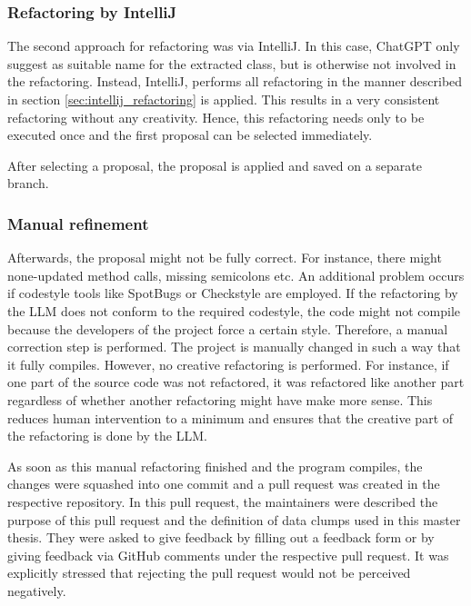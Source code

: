 \subsubsection{Refactoring by IntelliJ}

The second approach for refactoring was via IntelliJ. In this case, ChatGPT only suggest as suitable name for the extracted class, but is otherwise not involved in the refactoring. Instead, IntelliJ, performs all refactoring in the manner described in section  \ref{sec:intellij_refactoring} is applied. This results in a very consistent refactoring without any creativity. Hence, this refactoring needs only to be executed once and the first proposal can be selected immediately. 

After selecting a proposal, the proposal is applied and saved on a separate branch.

\subsubsection{Manual refinement}

Afterwards, the proposal might not be fully correct. For instance, there might none-updated method calls, missing semicolons etc. An additional problem occurs if codestyle tools like SpotBugs or Checkstyle are employed. If the refactoring by the \ac{LLM} does not conform to the required codestyle, the code might not compile because the developers of the project force a certain style. Therefore, a manual correction step is performed. The project is  manually changed in such a way that it fully compiles. However, no creative refactoring is performed. For instance, if one part of the source code was not refactored, it was refactored like another part regardless of whether another refactoring might have make more sense. This reduces human intervention to a minimum and ensures that the creative part of the refactoring is done by the \ac{LLM}. 

As soon as this manual refactoring finished and the program compiles, the changes were squashed into one commit and a pull request was created in the respective repository. In this pull request, the maintainers were described the purpose of this pull request and  the definition of data clumps used in this master thesis. They were asked to give feedback by filling out a feedback form or by giving feedback via GitHub comments under the respective pull request. It was explicitly stressed that rejecting the pull request would not be perceived negatively. 

